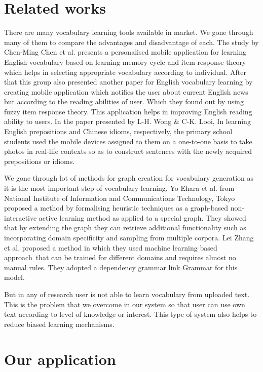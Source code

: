 \documentclass[11pt,a4paper]{article}
\begin{document}
\section{Related works}
There are many vocabulary learning tools available in market. We gone through many of them to compare the advantages and disadvantage of each. The study by Chen-Ming Chen et al. presents a personalised mobile application for learning English vocabulary based on learning memory cycle and item response theory which helps in selecting appropriate vocabulary according to individual. After that this group also presented another paper for English vocabulary learning by creating mobile application which notifies the user about current English news but according to the reading abilities of user. Which they found out by using fuzzy item response theory. This application helps in improving English reading ability to users. In the paper presented by L-H. Wong \& C-K. Looi, In learning English prepositions and Chinese idioms, respectively, the primary school students used the mobile devices assigned to them on a one-to-one basis to take photos in real-life contexts so as to construct sentences with the newly acquired prepositions or idioms. 

We gone through lot of methods for graph creation for vocabulary generation as it is the most important step of vocabulary learning. Yo Ehara et al. from National Institute of Information and Communications Technology, Tokyo proposed a method by formalising heuristic techniques as a graph-based non-interactive active learning method as applied to a special graph. They showed that by extending the graph they can retrieve additional functionality such as incorporating domain specificity and sampling from multiple corpora.
Lei Zhang et al. proposed a method in which they used machine learning based approach that can be trained for different domains and requires almost no manual rules. They adopted a dependency grammar link Grammar for this model. 

But in any of research user is not able to learn vocabulary from uploaded text. This is the problem that we overcome in our system so that user can use own text according to level of knowledge or interest. This type of system also helps to reduce biased learning mechanisms.  


\section{Our application}
\end{document}
